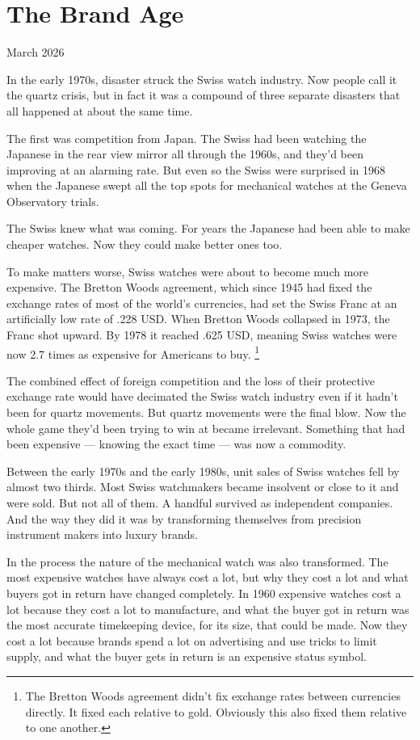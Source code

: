 \chapter{The Brand Age}

March 2026

In the early 1970s, disaster struck the Swiss watch industry. Now people
call it the quartz crisis, but in fact it was a compound of three
separate disasters that all happened at about the same time.

The first was competition from Japan. The Swiss had been watching the
Japanese in the rear view mirror all through the 1960s, and they'd been
improving at an alarming rate. But even so the Swiss were surprised in
1968 when the Japanese swept all the top spots for mechanical watches at
the Geneva Observatory trials.

The Swiss knew what was coming. For years the Japanese had been able to
make cheaper watches. Now they could make better ones too.

To make matters worse, Swiss watches were about to become much more
expensive. The Bretton Woods agreement, which since 1945 had fixed the
exchange rates of most of the world's currencies, had set the Swiss
Franc at an artificially low rate of .228 USD. When Bretton Woods
collapsed in 1973, the Franc shot upward. By 1978 it reached .625 USD,
meaning Swiss watches were now 2.7 times as expensive for Americans to
buy. \footnote{The Bretton Woods agreement didn't fix exchange rates between
currencies directly. It fixed each relative to gold. Obviously this also
fixed them relative to one another.}

The combined effect of foreign competition and the loss of their
protective exchange rate would have decimated the Swiss watch industry
even if it hadn't been for quartz movements. But quartz movements were
the final blow. Now the whole game they'd been trying to win at became
irrelevant. Something that had been expensive --- knowing the exact time
--- was now a commodity.

Between the early 1970s and the early 1980s, unit sales of Swiss watches
fell by almost two thirds. Most Swiss watchmakers became insolvent or
close to it and were sold. But not all of them. A handful survived as
independent companies. And the way they did it was by transforming
themselves from precision instrument makers into luxury brands.

In the process the nature of the mechanical watch was also transformed.
The most expensive watches have always cost a lot, but why they cost a
lot and what buyers got in return have changed completely. In 1960
expensive watches cost a lot because they cost a lot to manufacture, and
what the buyer got in return was the most accurate timekeeping device,
for its size, that could be made. Now they cost a lot because brands
spend a lot on advertising and use tricks to limit supply, and what the
buyer gets in return is an expensive status symbol.


